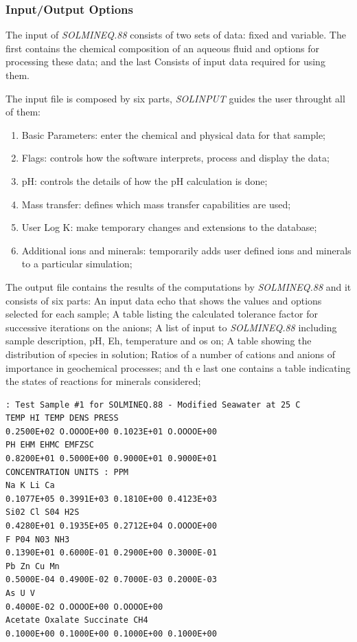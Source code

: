 \documentclass[ppgc,mestrado,English]{iiufrgs}
\begin{document}
\subsubsection{Input/Output Options}
The input of \emph{SOLMINEQ.88} consists of two sets of data: fixed and variable. The first contains the chemical composition of an aqueous fluid and options for processing these data; and the last Consists of input data required for using them.

The input file is composed by six parts, \emph{SOLINPUT} guides the user throught all of them:
\begin{enumerate}
\item Basic Parameters: enter the chemical and physical data for that sample;
\item Flags: controls how the software interprets, process and display the data;
\item pH: controls the details of how the pH calculation is done;
\item Mass transfer: defines which mass transfer capabilities are used;
\item User Log K: make temporary changes and extensions to the database;
\item Additional ions and minerals: temporarily adds user defined ions and minerals to a particular simulation;
\end{enumerate}

The output file contains the results of the computations by \emph{SOLMINEQ.88} and it consists of six parts: An input data echo that shows the values and options selected for each sample; A table listing the calculated tolerance factor for successive iterations on the anions; A list of input to \emph{SOLMINEQ.88} including sample description, pH, Eh, temperature and os on; A table showing the distribution of species in solution; Ratios of a number of cations and anions of importance in geochemical processes; and th
e last one contains a table indicating the states of reactions for minerals considered;

\begin{minipage}[c]{0.93\textwidth}
\begin{lstlisting}[frame=single, caption=\emph{SOLMINEQ.88}'s excerpt from the output file, label=solmineq:output]
 : Test Sample #1 for SOLMINEQ.88 - Modified Seawater at 25 C
TEMP HI TEMP DENS PRESS
0.2500E+02 O.OOOOE+00 0.1023E+01 O.OOOOE+00
PH EHM EHMC EMFZSC
0.8200E+01 0.5000E+00 0.9000E+01 0.9000E+01
CONCENTRATION UNITS : PPM
Na K Li Ca
0.1077E+05 0.3991E+03 0.1810E+00 0.4123E+03
Si02 Cl S04 H2S
0.4280E+01 0.1935E+05 0.2712E+04 O.OOOOE+00
F P04 N03 NH3
0.1390E+01 0.6000E-01 0.2900E+00 0.3000E-01
Pb Zn Cu Mn
0.5000E-04 0.4900E-02 0.7000E-03 0.2000E-03
As U V
0.4000E-02 O.OOOOE+00 O.OOOOE+00
Acetate Oxalate Succinate CH4
0.1000E+00 0.1000E+00 0.1000E+00 0.1000E+00
\end{lstlisting}
\end{minipage}
\end{document}
